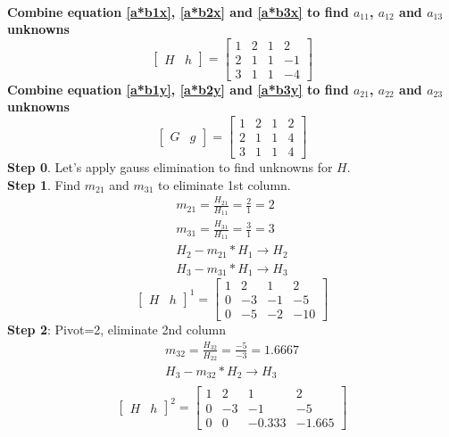 \documentclass{article}
\begin{document}
\\
\textbf{Combine equation \ref{a*b1x}, \ref{a*b2x} and \ref{a*b3x} to find $a_{11}$, $a_{12}$ and $a_{13}$ unknowns}
\[
\left[
\begin{array}{c|c}
H&h
\end{array}
\right]
=
\left[
\begin{array}{ccc|c}
	1&2&1&2\\
	2&1&1&-1\\
	3&1&1&-4 
\end{array}
\right]
\]
\textbf{Combine equation \ref{a*b1y}, \ref{a*b2y} and \ref{a*b3y} to find $a_{21}$, $a_{22}$ and $a_{23}$ unknowns}
\[
\left[
\begin{array}{c|c}
G&g
\end{array}
\right]
=
\left[
\begin{array}{ccc|c}
	1&2&1&2\\
	2&1&1&4\\
	3&1&1&4
\end{array}
\right]
\]
\textbf{Step 0}. Let's apply gauss elimination to find unknowns for $H$.\\
\textbf{Step 1}. Find $m_{21}$ and $m_{31}$ to eliminate 1st column.\\
\begin{align}
	m_{21}=\frac{H_{21}}{H_{11}}=\frac{2}{1}=2\\
	m_{31}=\frac{H_{31}}{H_{11}}=\frac{3}{1}=3\\
	H_2-m_{21}*H_1 \rightarrow  H_2\\
	H_3-m_{31}*H_1 \rightarrow  H_3
\end{align}
\[
\left[
\begin{array}{c|c}
H&h
\end{array}
\right]^1
=
\left[
\begin{array}{ccc|c}
	1&2&1&2\\
	0&-3&-1&-5\\
	0&-5&-2&-10 
\end{array}
\right]
\]
\textbf{Step 2}: Pivot=2, eliminate 2nd column
\begin{align}
	m_{32}=\frac{H_{32}}{H_{22}}=\frac{-5}{-3}=1.6667\\
	H_3-m_{32}*H_2 \rightarrow  H_3\\
\end{align}
\[
\left[
\begin{array}{c|c}
H&h
\end{array}
\right]^2
=
\left[
\begin{array}{ccc|c}
	1&2&1&2\\
	0&-3&-1&-5\\
	0&0&-0.333&-1.665
\end{array}
\right]
\]
\end{document}
